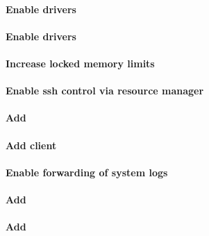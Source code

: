 \documentclass[letterpaper]{article}
\begin{document}
\paragraph{Enable \InfiniBand{} drivers}


\paragraph{Enable \OmniPath{} drivers}


\paragraph{Increase locked memory limits}


\paragraph{Enable ssh control via resource manager} 


\paragraph{Add \beegfs{}} \label{sec:add_beegfs}


\paragraph{Add \Lustre{} client} \label{sec:lustre_client}

\vspace*{0.25cm}



\paragraph{Enable forwarding of system logs} \label{sec:add_syslog}


\paragraph{Add \clustershell{}}


\paragraph{Add \genders{}}

\end{document}
